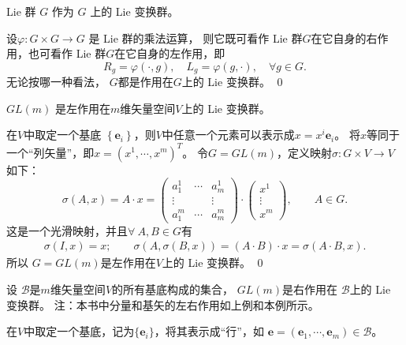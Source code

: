 \begin{example}
     Lie 群 $G$ 作为 $G$ 上的 Lie 变换群。
\end{example}
设$\varphi: G \times G \rightarrow G$ 是 Lie 群的乘法运算，
则它既可看作 Lie 群$G$在它自身的右作用，也可看作 Lie 群$G$在它自身的左作用，即
\begin{equation}
    R_g=\varphi(\cdot, g), \quad L_g=\varphi(g, \cdot), \quad \forall g \in G .
\end{equation}
无论按哪一种看法， $G$都是作用在$G$上的 Lie 变换群。
\qed


\begin{example}\label{chlg:exm_GLonV}
    $ GL(m)$ 是左作用在$m$维矢量空间$V$上的 Lie 变换群。
\end{example}

在$V$中取定一个基底 $\left\{\boldsymbol{e}_i\right\}$，则$V$中任意一个元素可以表示成$x= x^i \boldsymbol{e}_i$。
将$x$等同于一个“列矢量”，即$x=\left(x^1, \cdots, x^m\right)^T$。
令$G=GL(m)$，定义映射$\sigma: G \times V \rightarrow V$ 如下：
\begin{equation*}
    \sigma(A, x)=A \cdot x=\left(\begin{array}{ccc}
        a_1^1 & \cdots & a_m^1 \\
        \vdots & & \vdots \\
        a_1^m & \cdots & a_m^m
    \end{array}\right) \cdot\left(\begin{array}{c}
        x^1 \\
        \vdots \\
        x^m
    \end{array}\right) ,\qquad A\in G.
\end{equation*}
这是一个光滑映射，并且$\forall \ A, B \in G$有
\begin{align*}
    \sigma(I, x)=x; \qquad
    \sigma(A, \sigma(B, x))=(A \cdot B) \cdot x=\sigma(A \cdot B, x).
\end{align*}
所以 $G=GL(m)$是左作用在$V$上的 Lie 变换群。
\qed

\begin{example}\label{chlg:exm_GLonB}
    设 $\mathscr{B}$是$m$维矢量空间$V$的所有基底构成的集合，
    $GL(m)$是右作用在 $\mathscr{B}$上的 Lie 变换群。
    注：本书中分量和基矢的左右作用如上例和本例所示。
\end{example}

在$V$中取定一个基底，记为$\{\boldsymbol{e}_i\}$，将其表示成“行”，如
$\boldsymbol{e}=\left(\boldsymbol{e}_1, \cdots, \boldsymbol{e}_m\right) \in \mathscr{B}$。

